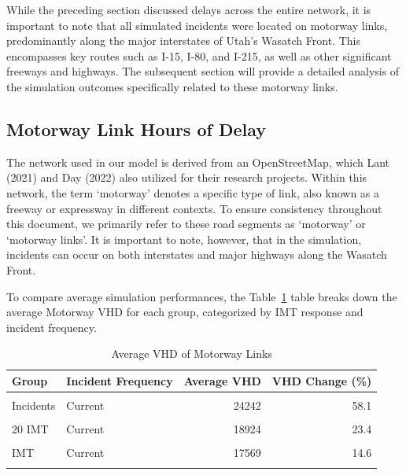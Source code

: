 \documentclass[fancy, oneside, mastersfancy, ms]{byuthesis}
\begin{document}
While the preceding section discussed delays across the entire network,
it is important to note that all simulated incidents were located on
motorway links, predominantly along the major interstates of Utah's
Wasatch Front. This encompasses key routes such as I-15, I-80, and
I-215, as well as other significant freeways and highways. The
subsequent section will provide a detailed analysis of the simulation
outcomes specifically related to these motorway links.

\hypertarget{motorway-link-hours-of-delay}{%
\subsection{Motorway Link Hours of
Delay}\label{motorway-link-hours-of-delay}}

The network used in our model is derived from an OpenStreetMap, which
Lant (2021) and Day (2022) also utilized for their research projects.
Within this network, the term `motorway' denotes a specific type of
link, also known as a freeway or expressway in different contexts. To
ensure consistency throughout this document, we primarily refer to these
road segments as `motorway' or `motorway links'. It is important to
note, however, that in the simulation, incidents can occur on both
interstates and major highways along the Wasatch Front.

To compare average simulation performances, the
Table~\ref{tbl-motorway_delays_table} table breaks down the average
Motorway VHD for each group, categorized by IMT response and incident
frequency.

\hypertarget{tbl-motorway_delays_table}{}
\begin{table}
\caption{\label{tbl-motorway_delays_table}Average VHD of Motorway Links }\tabularnewline

\centering
\begin{tabular}[t]{llrr}
\toprule
\textbf{Group} & \textbf{Incident Frequency} & \textbf{Average VHD} & \textbf{VHD Change (\%)}\\
\midrule
\cellcolor{gray!6}{Baseline} & \cellcolor{gray!6}{-} & \cellcolor{gray!6}{15335} & \cellcolor{gray!6}{0.0}\\
Incidents & Current & 24242 & 58.1\\
\cellcolor{gray!6}{Incidents} & \cellcolor{gray!6}{Increased} & \cellcolor{gray!6}{22321} & \cellcolor{gray!6}{45.6}\\
20 IMT & Current & 18924 & 23.4\\
\cellcolor{gray!6}{20 IMT} & \cellcolor{gray!6}{Increased} & \cellcolor{gray!6}{19176} & \cellcolor{gray!6}{25.0}\\
\addlinespace
30 IMT & Current & 17569 & 14.6\\
\cellcolor{gray!6}{30 IMT} & \cellcolor{gray!6}{Increased} & \cellcolor{gray!6}{18327} & \cellcolor{gray!6}{19.5}\\
\bottomrule
\end{tabular}
\end{table}
\end{document}
